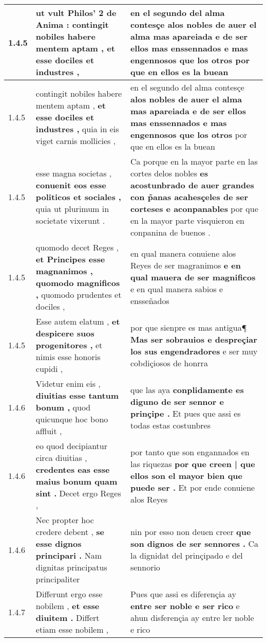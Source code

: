 \begin{tabular}{|p{1cm}|p{6.5cm}|p{6.5cm}|}
1.4.5 & ut vult Philos’ 2 de Anima : \textbf{ contingit nobiles habere mentem aptam , } et esse dociles et industres , & en el segundo del alma contesçe \textbf{ alos nobles de auer el alma mas apareiada e de ser ellos mas enssennados e mas engennosos que los otros } por que en ellos es la buean \\\hline
1.4.5 & contingit nobiles habere mentem aptam , \textbf{ et esse dociles et industres , } quia in eis viget carnis mollicies , & en el segundo del alma contesçe \textbf{ alos nobles de auer el alma mas apareiada e de ser ellos mas enssennados e mas engennosos que los otros } por que en ellos es la buean \\\hline
1.4.5 & esse magna societas , \textbf{ conuenit eos esse politicos et sociales , } quia ut plurimum in societate vixerunt . & Ca porque en la mayor parte en las cortes delos nobles \textbf{ es acostunbrado de auer grandes con p̃anas acahesçeles de ser corteses e aconpanables } por que en la mayor parte visquieron en conpanina de buenos . \\\hline
1.4.5 & quomodo decet Reges , \textbf{ et Principes esse magnanimos , quomodo magnificos , } quomodo prudentes et dociles , & en qual manera conuiene alos Reyes de ser magranimos \textbf{ e en qual mauera de ser magnificos } e en qual manera sabios e ensseñados \\\hline
1.4.5 & Esse autem elatum , \textbf{ et despicere suos progenitores , } et nimis esse honoris cupidi , & por que sienpre es mas antigua¶ \textbf{ Mas ser sobrauios e despreçiar los sus engendradores } e ser muy cobdiçiosos de honrra \\\hline
1.4.6 & Videtur enim eis , \textbf{ diuitias esse tantum bonum , } quod quicunque hoc bono affluit , & que las aya \textbf{ conplidamente es diguno de ser sennor e prinçipe . } Et pues que assi es todas estas costunbres \\\hline
1.4.6 & eo quod decipiantur circa diuitias , \textbf{ credentes eas esse maius bonum quam sint . } Decet ergo Reges , & por tanto que son engannados en las riquezas \textbf{ por que creen | que ellos son el mayor bien que puede ser . } Et por ende conuiene alos Reyes \\\hline
1.4.6 & Nec propter hoc credere debent , \textbf{ se esse dignos principari . } Nam dignitas principatus principaliter & nin por esso non deuen creer \textbf{ que son dignos de ser sennores . } Ca la dignidat del prinçipado e del sennorio \\\hline
1.4.7 & Differunt ergo esse nobilem , \textbf{ et esse diuitem . } Differt etiam esse nobilem , & Pues que assi es diferençia ay \textbf{ entre ser noble e ser rico } e ahun disferençia ay entre ler noble e rico \\\hline

\end{tabular}
